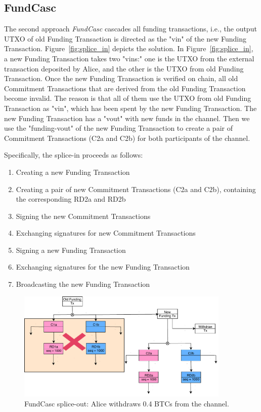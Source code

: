 \subsection{FundCasc}


The second approach {\em FundCasc} cascades all funding transactions, i.e., the output UTXO of old Funding Transaction is directed as the "vin" of the new Funding
Transaction. Figure~\ref{fig:splice_in} depicts the solution. In Figure~\ref{fig:splice_in}, a new Funding Transaction takes two "vins:" one is the UTXO from the external transaction deposited by Alice, and the other is the UTXO from old Funding Transaction. Once the new Funding Transaction is verified on chain, all old Commitment Transactions that are derived from the old Funding Transaction become invalid. The reason is that all of them use the UTXO from old Funding Transaction as "vin", which has been spent by the new Funding Transaction. The new Funding Transaction has a "vout" with new funds in the channel. Then we use the "funding-vout" of the new Funding Transaction to create a pair of Commitment Transactions (C2a and C2b) for both participants of the channel.


Specifically, the splice-in proceeds as follows:
\begin{enumerate}
\item Creating a new Funding Transaction
\item Creating a pair of new Commitment Transactions (C2a and C2b), containing the corresponding RD2a and RD2b
\item Signing the new Commitment Transactions
\item Exchanging signatures for new Commitment Transactions
\item Signing a new Funding Transaction
\item Exchanging signatures for the new Funding Transaction
\item Broadcasting the new Funding Transaction
\end{enumerate}

\begin{figure}[H]
\centering
\includegraphics[width=4in]{figs/splice_out.pdf}
\vspace{-6pt}
\caption{FundCasc splice-out: Alice withdraws 0.4 BTCs from the channel.}
\label{fig:splice_out}
\end{figure}

